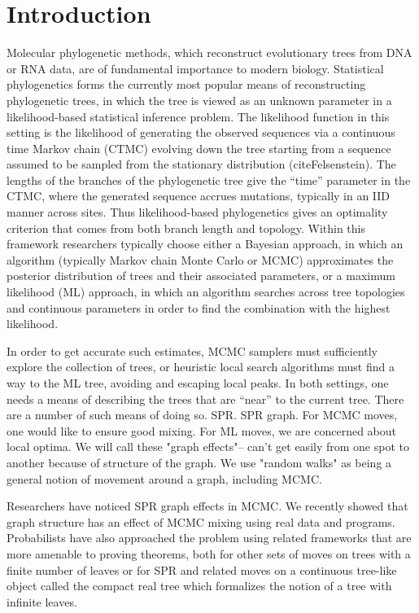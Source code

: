 \documentclass{amsart}
\begin{document}
\section{Introduction}
Molecular phylogenetic methods, which reconstruct evolutionary trees from DNA or RNA data, are of fundamental importance to modern biology.
Statistical phylogenetics forms the currently most popular means of reconstructing phylogenetic trees, in which the tree is viewed as an unknown parameter in a likelihood-based statistical inference problem.
The likelihood function in this setting is the likelihood of generating the observed sequences via a continuous time Markov chain (CTMC) evolving down the tree starting from a sequence assumed to be sampled from the stationary distribution (cite{Felsenstein}).
The lengths of the branches of the phylogenetic tree give the ``time'' parameter in the CTMC, where the generated sequence accrues mutations, typically in an IID manner across sites.
Thus likelihood-based phylogenetics gives an optimality criterion that comes from both branch length and topology.
Within this framework researchers typically choose either a Bayesian approach, in which an algorithm (typically Markov chain Monte Carlo or MCMC) approximates the posterior distribution of trees and their associated parameters, or a maximum likelihood (ML) approach, in which an algorithm searches across tree topologies and continuous parameters in order to find the combination with the highest likelihood.

In order to get accurate such estimates, MCMC samplers must sufficiently explore the collection of trees, or heuristic local search algorithms must find a way to the ML tree, avoiding and escaping local peaks.
In both settings, one needs a means of describing the trees that are ``near'' to the current tree.
There are a number of such means of doing so.
SPR.
SPR graph.
For MCMC moves, one would like to ensure good mixing.
For ML moves, we are concerned about local optima.
We will call these "graph effects"-- can't get easily from one spot to another because of structure of the graph.
We use "random walks" as being a general notion of movement around a graph, including MCMC.

Researchers have noticed SPR graph effects in MCMC.
\cite{Mossel2005-ly,Mossel2006-fo}
\cite{Ronquist2006-fv}
\cite{Stefankovic2011-hu}
We recently showed that graph structure has an effect of MCMC mixing using real data and programs.
\cite{Whidden2015-yi}
Probabilists have also approached the problem using related frameworks that are more amenable to proving theorems, both for other sets of moves on trees with a finite number of leaves \cite{Aldous2000-vg,Diaconis2002-gy} or for SPR and related moves on a continuous tree-like object called the compact real tree which formalizes the notion of a tree with infinite leaves\cite{Evans2006-xh,Athreya2014-de}.
\end{document}
